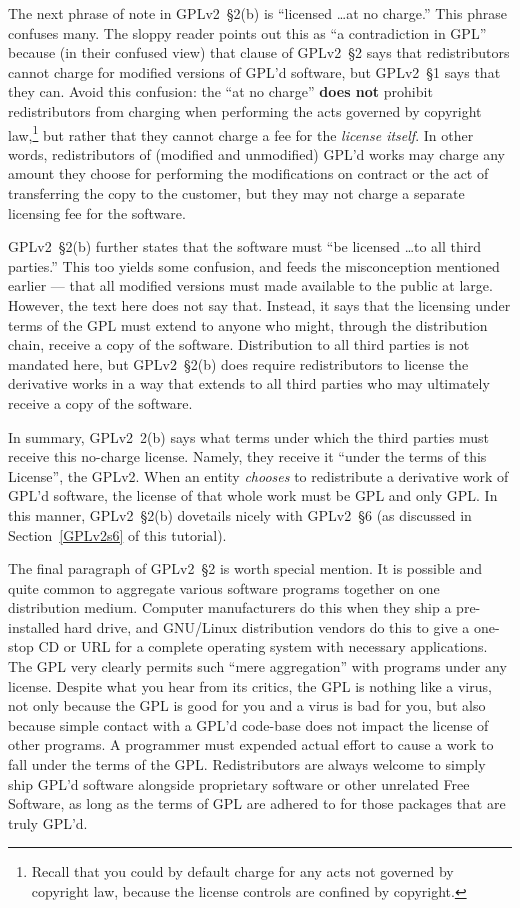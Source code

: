 \medskip

The next phrase of note in GPLv2~\S2(b) is ``licensed \ldots at no charge.''
This phrase  confuses many.  The sloppy reader points out this as ``a
contradiction in GPL'' because (in their confused view) that clause of GPLv2~\S2 says that redistributors cannot
charge for modified versions of GPL'd software, but GPLv2~\S1 says that
they can.  Avoid this confusion: the ``at no charge'' \textbf{does not} prohibit redistributors from
charging when performing the acts governed by copyright
law,\footnote{Recall that you could by default charge for any acts not
governed by copyright law, because the license controls are confined
by copyright.} but rather that they cannot charge a fee for the
\emph{license itself}.  In other words, redistributors of (modified
and unmodified) GPL'd works may charge any amount they choose for
performing the modifications on contract or the act of transferring
the copy to the customer, but they may not charge a separate licensing
fee for the software.

GPLv2~\S2(b) further states that the software must ``be licensed \ldots to all
third parties.''  This too yields some confusion, and feeds the
misconception mentioned earlier --- that all modified versions must made
available to the public at large.  However, the text here does not say
that.  Instead, it says that the licensing under terms of the GPL must
extend to anyone who might, through the distribution chain, receive a copy
of the software.  Distribution to all third parties is not mandated here,
but GPLv2~\S2(b) does require redistributors to license the derivative works in
a way that extends to all third parties who may ultimately receive a
copy of the software.

In summary, GPLv2\ 2(b) says what terms under which the third parties must
receive this no-charge license.  Namely, they receive it ``under the terms
of this License'', the GPLv2.  When an entity \emph{chooses} to redistribute
a derivative work of GPL'd software, the license of that whole 
work must be GPL and only GPL\@.  In this manner, GPLv2~\S2(b) dovetails nicely
with GPLv2~\S6 (as discussed in Section~\ref{GPLv2s6} of this tutorial).

\medskip

The final paragraph of GPLv2~\S2 is worth special mention.  It is possible and
quite common to aggregate various software programs together on one
distribution medium.  Computer manufacturers do this when they ship a
pre-installed hard drive, and GNU/Linux distribution vendors do this to
give a one-stop CD or URL for a complete operating system with necessary
applications.  The GPL very clearly permits such ``mere aggregation'' with
programs under any license.  Despite what you hear from its critics, the
GPL is nothing like a virus, not only because the GPL is good for you and
a virus is bad for you, but also because simple contact with a GPL'd
code-base does not impact the license of other programs.  A programmer must
expended actual effort  to cause a work to fall under the terms
of the GPL.  Redistributors are always welcome to simply ship GPL'd
software alongside proprietary software or other unrelated Free Software,
as long as the terms of GPL are adhered to for those packages that are
truly GPL'd.

